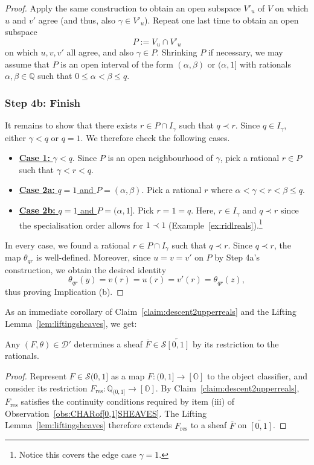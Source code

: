 \documentclass[a4paper, 11pt,reqno]{amsart}
\newcommand{\baseS}{\mathcal{S}}
\newcommand{\D}{\mathcal{D}}
\newcommand{\Q}{\mathbb{Q}}
\begin{document}
\begin{proof}
	Apply the same construction to obtain an open subspace $V'_{u}$ of $V$ on which $u$ and $v'$ agree (and thus, also $\gamma\in V'_{u}$). Repeat one last time to obtain an open subspace
	$$P:=V_u\cap V'_{u}$$
on which $u,v,v'$ all agree, and also $\gamma\in P$. Shrinking $P$ if necessary, we may assume that $P$ is an open interval of the form $(\alpha,\beta)$ or $(\alpha,1]$ with rationals $\alpha,\beta\in\Q$ such that $0\leq \alpha<\beta\leq q$.
	
	\subsubsection*{Step 4b: Finish} It remains to show that there exists $r\in P\cap I_{\gamma}$ such that $q\prec r$. Since $q\in I_\gamma$, either $\gamma<q$ or $q=1$. We therefore check the following cases.
	\begin{itemize}
		\item \underline{\textbf{Case 1:} $\gamma<q$}. Since $P$ is an open neighbourhood of $\gamma$, pick a rational	$r\in P$ such that $\gamma<r<q.$ 
		
		\smallskip 
		\item \underline{\textbf{Case 2a:} $q=1$ and $P=(\alpha,\beta)$}. Pick a rational $r$ where $\alpha<\gamma<r<\beta\leq q$. 
		
		\smallskip
		\item \underline{\textbf{Case 2b:} $q=1$ and $P=(\alpha,1]$}. Pick $r=1=q$. Here, $r\in I_\gamma$ and $q\prec r$ since the specialisation order allows for $1\prec1$ (Example~\ref{ex:ridlreals}).\footnote{Notice this covers the edge case $\gamma=1$.}
	\end{itemize}
In every case, we found a rational $r\in P\cap I_{\gamma}$ such that $q\prec r$. Since $q\prec r$, the map $\theta_{qr}$ is well-defined.  Moreover, since $u=v=v'$ on $P$ by Step 4a's construction, we obtain the desired identity $$\theta_{qr}(y)=v(r)=u(r)=v'(r)=\theta_{qr}(z),$$
thus proving Implication (b).	
\end{proof}

As an immediate corollary of  Claim~\ref{claim:descent2upperreals} and the Lifting Lemma~\ref{lem:liftingsheaves}, we get:

\begin{corollary}\label{cor:GETSHEAFoverUPPER} Any $(F,\theta)\in\D'$ determines a sheaf $\overline{F}\in\baseS\overleftarrow{[0,1]}$ by its restriction to the rationals.
\end{corollary}
\begin{proof} Represent $F\in\baseS(0,1]$ as a map $F\colon (0,1]\rightarrow [\mathbb{O}]$ to the object classifier, and consider its restriction $F_{\text{res}}\colon\mathbb{Q}_{(0,1]}\rightarrow [\mathbb{O}]$. By Claim~\ref{claim:descent2upperreals}, $F_{\text{res}}$ satisfies the continuity conditions required by item (iii) of Observation~\ref{obs:CHARof[0,1]SHEAVES}. The Lifting Lemma~\ref{lem:liftingsheaves} therefore extends $F_{\mathrm{res}}$ to a sheaf $\overline{F}$ on $\overleftarrow{[0,1]}$.
\end{proof}
\end{document}
